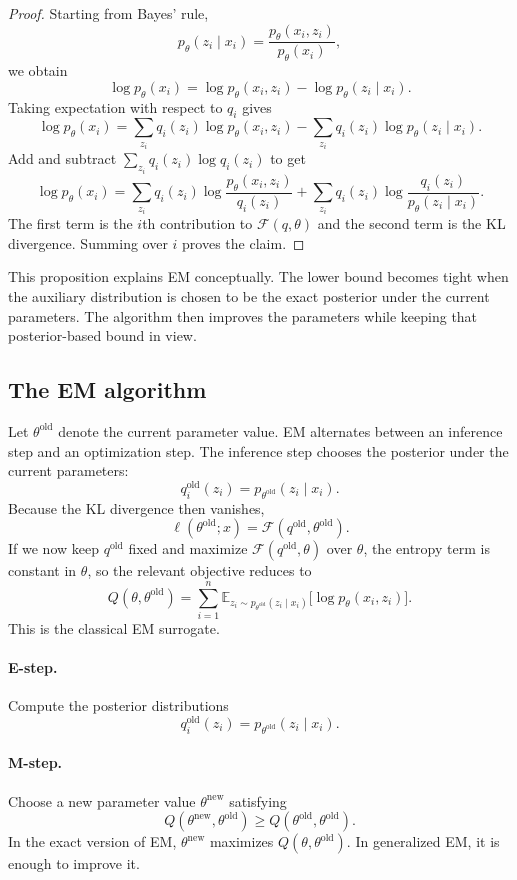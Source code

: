 \begin{proof}
Starting from Bayes' rule,
\[
p_\theta(z_i\mid x_i)=\frac{p_\theta(x_i,z_i)}{p_\theta(x_i)},
\]
we obtain
\[
\log p_\theta(x_i)
= \log p_\theta(x_i,z_i) - \log p_\theta(z_i\mid x_i).
\]
Taking expectation with respect to $q_i$ gives
\[
\log p_\theta(x_i)
= \sum_{z_i} q_i(z_i)\log p_\theta(x_i,z_i)
- \sum_{z_i} q_i(z_i)\log p_\theta(z_i\mid x_i).
\]
Add and subtract $\sum_{z_i}q_i(z_i)\log q_i(z_i)$ to get
\[
\log p_\theta(x_i)
=
\sum_{z_i} q_i(z_i)\log \frac{p_\theta(x_i,z_i)}{q_i(z_i)}
+
\sum_{z_i} q_i(z_i)\log \frac{q_i(z_i)}{p_\theta(z_i\mid x_i)}.
\]
The first term is the $i$th contribution to $\mathcal{F}(q,\theta)$ and the second term is the KL divergence.
Summing over $i$ proves the claim.
\end{proof}

This proposition explains EM conceptually.
The lower bound becomes tight when the auxiliary distribution is chosen to be the exact posterior under the current parameters.
The algorithm then improves the parameters while keeping that posterior-based bound in view.

\subsection*{The EM algorithm}

Let $\theta^{\mathrm{old}}$ denote the current parameter value.
EM alternates between an inference step and an optimization step.
The inference step chooses the posterior under the current parameters:
\[
q_i^{\mathrm{old}}(z_i)=p_{\theta^{\mathrm{old}}}(z_i\mid x_i).
\]
Because the KL divergence then vanishes,
\[
\ell(\theta^{\mathrm{old}};x)=\mathcal{F}(q^{\mathrm{old}},\theta^{\mathrm{old}}).
\]
If we now keep $q^{\mathrm{old}}$ fixed and maximize $\mathcal{F}(q^{\mathrm{old}},\theta)$ over $\theta$, the entropy term is constant in $\theta$, so the relevant objective reduces to
\[
Q(\theta,\theta^{\mathrm{old}})
=
\sum_{i=1}^n \mathbb{E}_{z_i\sim p_{\theta^{\mathrm{old}}}(z_i\mid x_i)}
\bigl[\log p_\theta(x_i,z_i)\bigr].
\]
This is the classical EM surrogate.

\paragraph{E-step.}
Compute the posterior distributions
\[
q_i^{\mathrm{old}}(z_i)=p_{\theta^{\mathrm{old}}}(z_i\mid x_i).
\]

\paragraph{M-step.}
Choose a new parameter value $\theta^{\mathrm{new}}$ satisfying
\[
Q(\theta^{\mathrm{new}},\theta^{\mathrm{old}})
\geq
Q(\theta^{\mathrm{old}},\theta^{\mathrm{old}}).
\]
In the exact version of EM, $\theta^{\mathrm{new}}$ maximizes $Q(\theta,\theta^{\mathrm{old}})$.
In generalized EM, it is enough to improve it.

